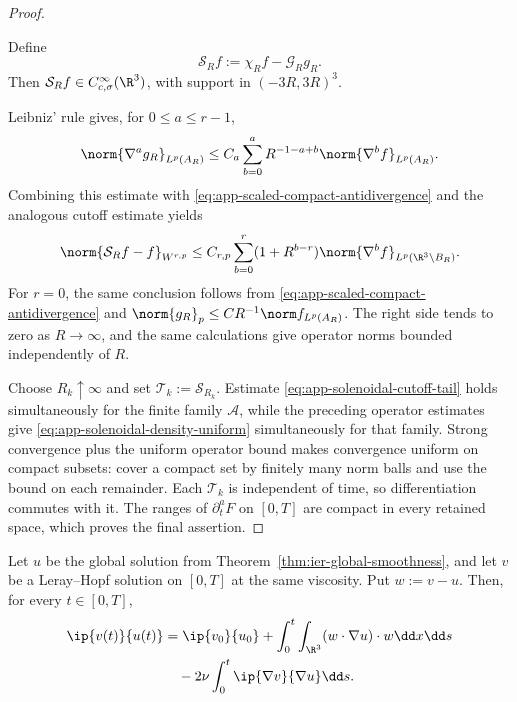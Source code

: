 \begin{proof}
\begin{samepage}
Define
\[
 \mathcal S_Rf:=\chi_Rf-\mathcal G_Rg_R.
\]
Then \(\mathcal S_Rf\in C_{c,\sigma}^\infty(\R^3)\), with support in
\((-3R,3R)^3\).
\end{samepage}
Leibniz' rule gives, for \(0\le a\le r-1\),
\[
 \norm{\nabla^ag_R}_{L^p(A_R)}
 \le C_a\sum_{b=0}^{a}
 R^{-1-a+b}\norm{\nabla^bf}_{L^p(A_R)}.
\]
Combining this estimate with
\eqref{eq:app-scaled-compact-antidivergence} and the analogous cutoff
estimate yields
\begin{equation}
 \norm{\mathcal S_Rf-f}_{W^{r,p}}
 \le C_{r,p}\sum_{b=0}^{r}
 (1+R^{b-r})\norm{\nabla^bf}_{L^p(\R^3\setminus B_R)}.
 \label{eq:app-solenoidal-cutoff-tail}
\end{equation}
For \(r=0\), the same conclusion follows from
\eqref{eq:app-scaled-compact-antidivergence} and
\(\norm{g_R}_p\le C R^{-1}\norm f_{L^p(A_R)}\).
The right side tends to zero as \(R\to\infty\), and the same calculations
give operator norms bounded independently of \(R\).

Choose \(R_k\uparrow\infty\) and set
\(\mathcal T_k:=\mathcal S_{R_k}\).  Estimate
\eqref{eq:app-solenoidal-cutoff-tail} holds simultaneously for the finite
family \(\mathscr A\), while the preceding operator estimates give
\eqref{eq:app-solenoidal-density-uniform} simultaneously for that family.
Strong convergence plus the uniform operator bound makes convergence
uniform on compact subsets: cover a compact set by finitely many norm balls
and use the bound on each remainder.  Each \(\mathcal T_k\) is independent
of time, so differentiation commutes with it.  The ranges of
\(\partial_t^aF\) on \([0,T]\) are compact in every retained space, which
proves the final assertion.
\end{proof}

\begin{lemma}
\label{lem:app-cross-energy}
Let \(u\) be the global solution from
Theorem~\ref{thm:ier-global-smoothness}, and let \(v\) be a Leray--Hopf
solution on \([0,T]\) at the same viscosity.  Put \(w:=v-u\).  Then, for every
\(t\in[0,T]\),
\begin{align}
 \ip{v(t)}{u(t)}
 &=
 \ip{v_0}{u_0}
 +\int_0^t\int_{\R^3}
       (w\cdot\nabla u)\cdot w\dd x\dd s
 \notag\\
 &\quad
 -2\nu\int_0^t\ip{\nabla v}{\nabla u}\dd s.
 \label{eq:app-cross-energy}
\end{align}
\end{lemma}

